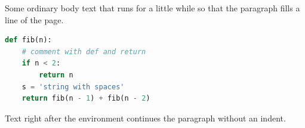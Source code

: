 \documentclass{article}
\begin{document}
Some ordinary body text that runs for a little while so that the paragraph fills a line of the page.
\begin{lstlisting}[language=Python,basicstyle=\ttfamily\small]
def fib(n):
    # comment with def and return
    if n < 2:
        return n
    s = 'string with spaces'
    return fib(n - 1) + fib(n - 2)
\end{lstlisting}
Text right after the environment continues the paragraph without an indent.
\end{document}
